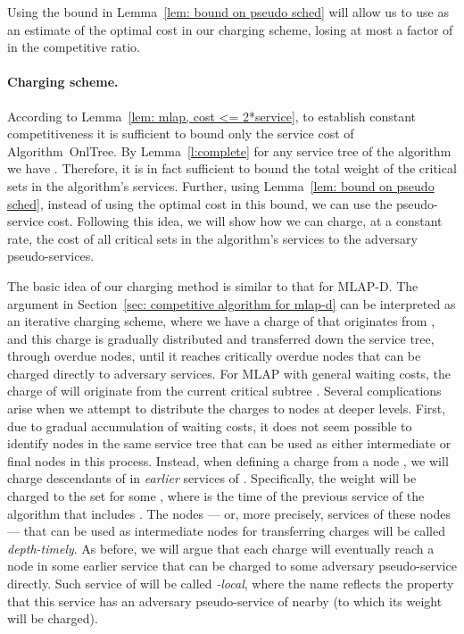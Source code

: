 \documentclass[a4paper]{article}
\newcommand{\OnAlgTreesGeneral}{{\sc OnlTree}}
\newcommand{\MLAP}{\mbox{\rm\textsf{MLAP}}}
\newcommand{\MLAPD}{\mbox{\rm\textsf{MLAP-D}}}
\begin{document}
Using the bound in Lemma~\ref{lem: bound on pseudo sched}
will allow us to use  as an estimate of
the optimal cost in our charging scheme, losing at most a factor of  in the
competitive ratio. 



\paragraph{Charging scheme.}

According to Lemma~\ref{lem: mlap, cost <= 2*service}, to establish constant
competitiveness it is sufficient
to bound only the service cost of Algorithm~{\OnAlgTreesGeneral}.
By Lemma~\ref{l:complete}
for any service tree  of the algorithm we have .  
Therefore, it is in fact sufficient to bound the total weight of the critical
sets in the algorithm's services. 
Further, using Lemma~\ref{lem: bound on pseudo sched}, instead of 
using the optimal cost in this bound, we can use the pseudo-service cost.
Following this idea, we will show how we can charge, at a constant rate,
the cost of
all critical sets  in the algorithm's services to the adversary
pseudo-services. 

The basic idea of our charging method is similar to that for {\MLAPD}.
The argument in Section~\ref{sec: competitive algorithm for mlap-d}
can be interpreted as an iterative charging scheme, where we have a
charge of  that originates from , and this charge is
gradually distributed and transferred down the service tree, through
overdue nodes, until it reaches critically overdue nodes that can be
charged directly to adversary services.  For {\MLAP} with general
waiting costs, the charge of  will originate from the
current critical subtree . Several complications arise when we attempt to
distribute the charges to nodes at deeper levels.
First,
due to gradual accumulation of waiting costs, it does not seem
possible to identify nodes in the same service tree that can be used
as either intermediate or final nodes in this process.  Instead, when
defining a charge from a node , we will charge descendants of  in 
\emph{earlier} services of
. Specifically, the weight  will be charged to the set
 for some , where  is the time of the previous
service of the algorithm that includes .  The nodes --- or, more
precisely, services of these nodes --- that can be used as
intermediate nodes for transferring charges will be called
\emph{depth-timely}.  As before, we will argue that each charge will
eventually reach a node  in some earlier service that can be
charged to some adversary pseudo-service directly.  Such service of
 will be called \emph{-local}, where the name reflects the property
that this service has an adversary pseudo-service of  nearby (to
which its weight  will be charged).
\end{document}
